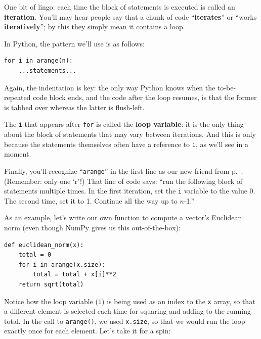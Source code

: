 One bit of lingo: each time the block of statements is executed is called an
\textbf{iteration}. You'll may hear people say that a chunk of code
``\textbf{iterates}'' or ``works \textbf{iteratively}''; by this they simply
mean it contains a loop.

\smallskip

In Python, the pattern we'll use is as follows:

\begin{Verbatim}[fontsize=\small,samepage=true,frame=single,framesep=3mm]
for i in arange(n):
    ...statements...
\end{Verbatim}


Again, the indentation is key: the only way Python knows when the
to-be-repeated code block ends, and the code after the loop resumes, is that
the former is tabbed over whereas the latter is flush-left.

The \texttt{i} that appears after \texttt{for} is called the \textbf{loop
variable}: it is the only thing about the block of statements that may vary
between iterations. And this is only because the statements themselves often
have a reference to \texttt{i}, as we'll see in a moment.

Finally, you'll recognize ``\texttt{arange}'' in the first line as our new
friend from p.~\pageref{arange}. (Remember: only one `r'!) That line of code
says: ``run the following block of statements multiple times. In the first
iteration, set the \texttt{i} variable to the value 0. The second time, set it
to 1. Continue all the way up to $n$-1.''

\medskip

As an example, let's write our own function to compute a vector's Euclidean
norm (even though NumPy gives us this out-of-the-box):

\begin{Verbatim}[fontsize=\small,samepage=true,frame=single,framesep=3mm]
def euclidean_norm(x):
    total = 0
    for i in arange(x.size):
        total = total + x[i]**2
    return sqrt(total)
\end{Verbatim}

Notice how the loop variable (\texttt{i}) is being used as an index to the
\texttt{x} array, so that a different element is selected each time for
squaring and adding to the running total. In the call to \texttt{arange()}, we
used \texttt{x.size}, so that we would run the loop exactly once for each
element. Let's take it for a spin:

